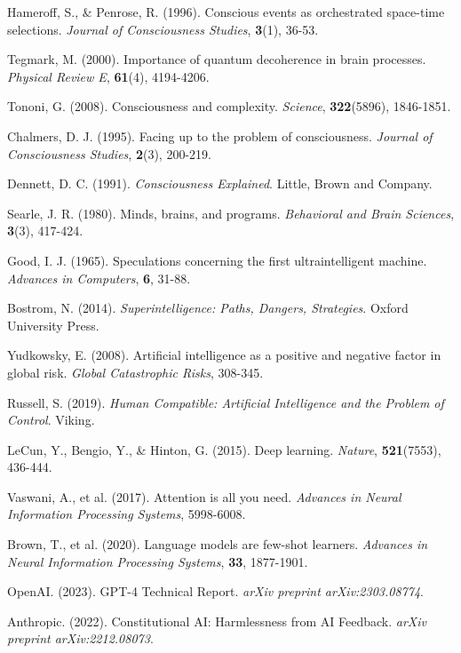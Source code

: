 \documentclass[12pt,a4paper]{article}
\begin{document}
\begin{thebibliography}{99}
Hameroff, S., \& Penrose, R. (1996). Conscious events as orchestrated space-time selections. \textit{Journal of Consciousness Studies}, \textbf{3}(1), 36-53.

Tegmark, M. (2000). Importance of quantum decoherence in brain processes. \textit{Physical Review E}, \textbf{61}(4), 4194-4206.

Tononi, G. (2008). Consciousness and complexity. \textit{Science}, \textbf{322}(5896), 1846-1851.

Chalmers, D. J. (1995). Facing up to the problem of consciousness. \textit{Journal of Consciousness Studies}, \textbf{2}(3), 200-219.

Dennett, D. C. (1991). \textit{Consciousness Explained}. Little, Brown and Company.

Searle, J. R. (1980). Minds, brains, and programs. \textit{Behavioral and Brain Sciences}, \textbf{3}(3), 417-424.

Good, I. J. (1965). Speculations concerning the first ultraintelligent machine. \textit{Advances in Computers}, \textbf{6}, 31-88.

Bostrom, N. (2014). \textit{Superintelligence: Paths, Dangers, Strategies}. Oxford University Press.

Yudkowsky, E. (2008). Artificial intelligence as a positive and negative factor in global risk. \textit{Global Catastrophic Risks}, 308-345.

Russell, S. (2019). \textit{Human Compatible: Artificial Intelligence and the Problem of Control}. Viking.

LeCun, Y., Bengio, Y., \& Hinton, G. (2015). Deep learning. \textit{Nature}, \textbf{521}(7553), 436-444.

Vaswani, A., et al. (2017). Attention is all you need. \textit{Advances in Neural Information Processing Systems}, 5998-6008.

Brown, T., et al. (2020). Language models are few-shot learners. \textit{Advances in Neural Information Processing Systems}, \textbf{33}, 1877-1901.

OpenAI. (2023). GPT-4 Technical Report. \textit{arXiv preprint arXiv:2303.08774}.

Anthropic. (2022). Constitutional AI: Harmlessness from AI Feedback. \textit{arXiv preprint arXiv:2212.08073}.


\end{thebibliography}
\end{document}
